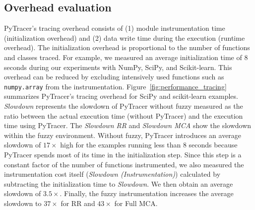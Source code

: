 \documentclass[11pt]{article}
\newcommand{\tristan}[1]{\color{orange}\textbf{From Tristan:} #1\color{black}\xspace}
\newcommand{\pytracer}[0]{PyTracer\xspace}
\begin{document}
\subsection{Overhead evaluation}
\pytracer's tracing overhead consists of (1) module instrumentation time (initialization overhead) and (2) data write time during the execution (runtime overhead). The initialization overhead is proportional to the number of functions and classes traced. For example, we measured an average initialization time of 8 seconds during our experiments with  NumPy, SciPy, and Scikit-learn. This overhead can be reduced by excluding intensively used functions such as \texttt{numpy.array} from the instrumentation.
Figure~\ref{fig:performance_tracing} summarizes \pytracer's tracing overhead for SciPy and scikit-learn examples. 
\textit{Slowdown} represents the slowdown of \pytracer without fuzzy measured as the ratio between the actual execution time (without \pytracer) and the execution time using \pytracer.
The \textit{Slowdown RR} and \textit{Slowdown MCA} show the slowdown within the fuzzy environment. 
Without fuzzy, \pytracer introduces an average slowdown of $17\times$ high for the examples running less than 8 seconds because \pytracer spends most of its time in the initialization step. Since this step is a constant factor of the number of functions instrumented, we also measured the instrumentation cost itself (\textit{Slowdown (Instrumentation)}) calculated by subtracting the initialization time to \textit{Slowdown}. We then obtain an average slowdown of $3.5\times$.
Finally, the fuzzy instrumentation increases the average slowdown to $37\times$ for RR and $43\times$ for Full MCA.

\end{document}
